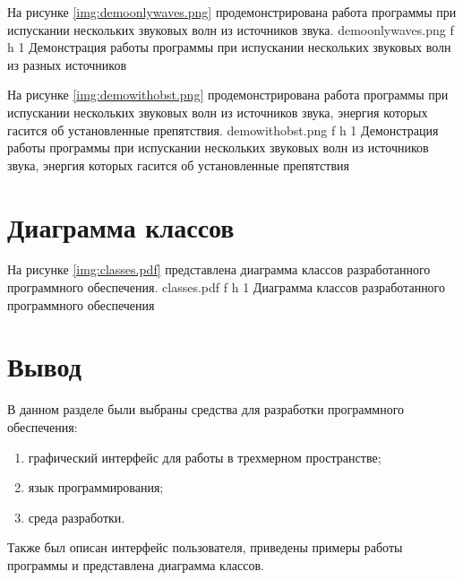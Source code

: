 На рисунке \ref{img:demoonlywaves.png} продемонстрирована работа программы при испускании нескольких звуковых волн из источников звука.
	{demoonlywaves.png}
	{f}
	{h}
	{1\textwidth}
	{Демонстрация работы программы при испускании нескольких звуковых волн из разных источников}
	
\clearpage

На рисунке \ref{img:demowithobst.png} продемонстрирована работа программы при испускании нескольких звуковых волн из источников звука, энергия которых гасится об установленные препятствия.
	{demowithobst.png}
	{f}
	{h}
	{1\textwidth}
	{Демонстрация работы программы при испускании нескольких звуковых волн из источников звука, энергия которых гасится об установленные препятствия}

\clearpage

\section{Диаграмма классов}

На рисунке \ref{img:classes.pdf} представлена диаграмма классов разработанного программного обеспечения.
	{classes.pdf}
	{f}
	{h}
	{1\textwidth}
	{Диаграмма классов разработанного программного обеспечения}

\section{Вывод}

В данном разделе были выбраны средства для разработки программного обеспечения:
\begin{enumerate}
	\item графический интерфейс для работы в трехмерном пространстве;
	\item язык программирования;
	\item среда разработки.
\end{enumerate}
Также был описан интерфейс пользователя, приведены примеры работы программы и представлена диаграмма классов.
